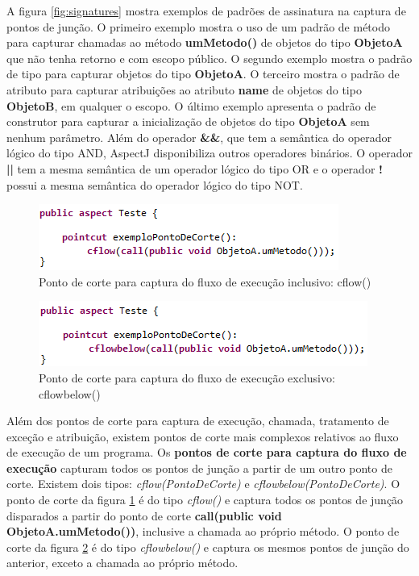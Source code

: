 A figura \ref{fig:signatures} mostra exemplos de padrões de assinatura na captura de pontos de junção. O primeiro exemplo mostra o uso de um padrão de
método para capturar chamadas ao método \textbf{umMetodo()} de objetos do tipo \textbf{ObjetoA} que não tenha retorno e com escopo público. O segundo
exemplo mostra o padrão de tipo para capturar objetos do tipo \textbf{ObjetoA}. O terceiro mostra o padrão de atributo para capturar atribuições ao
atributo \textbf{name} de objetos do tipo \textbf{ObjetoB}, em qualquer o escopo. O último exemplo apresenta o padrão de construtor para capturar a
inicialização de objetos do tipo \textbf{ObjetoA} sem nenhum parâmetro. Além do operador \textbf{\&\&}, que tem a semântica do operador lógico do tipo
AND, AspectJ disponibiliza outros operadores binários. O operador \textbf{||} tem a mesma semântica de um operador lógico do tipo OR e o operador
\textbf{!} possui a mesma semântica do operador lógico do tipo NOT.

\begin{figure}[!hb]
	\centering
	\includegraphics{img/flow_p1.png}
	\caption{Ponto de corte para captura do fluxo de execução inclusivo: cflow()}\label{fig:flow_p1}
\end{figure}

\begin{figure}[!hb]
	\centering
	\includegraphics{img/flow_p2.png}
	\caption{Ponto de corte para captura do fluxo de execução exclusivo: cflowbelow()}\label{fig:flow_p2}
\end{figure}
 
Além dos pontos de corte para captura de execução, chamada, tratamento de exceção e atribuição, existem pontos de corte mais complexos relativos ao
fluxo de execução de um programa. Os \textbf{pontos de corte para captura do fluxo de execução} capturam todos os pontos de junção a partir de um outro ponto de
corte. Existem dois tipos: \textit{cflow(PontoDeCorte)} e \textit{cflowbelow(PontoDeCorte)}. O ponto de corte da figura \ref{fig:flow_p1}
é do tipo \textit{cflow()} e captura todos os pontos de junção disparados a partir do ponto de corte \textbf{call(public void ObjetoA.umMetodo())},
inclusive a chamada ao próprio método. O ponto de corte da figura \ref{fig:flow_p2} é do tipo \textit{cflowbelow()} e captura os mesmos pontos de
junção do anterior, exceto a chamada ao próprio método.


